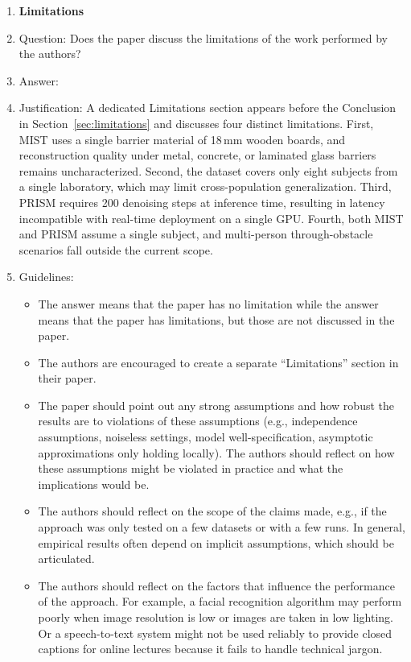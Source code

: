 \begin{enumerate}
\item {\bf Limitations}
    \item[] Question: Does the paper discuss the limitations of the work performed by the authors?
    \item[] Answer: \answerYes{}
    \item[] Justification: A dedicated Limitations section appears before the Conclusion in Section~\ref{sec:limitations} and discusses four distinct limitations. First, MIST uses a single barrier material of 18\,mm wooden boards, and reconstruction quality under metal, concrete, or laminated glass barriers remains uncharacterized. Second, the dataset covers only eight subjects from a single laboratory, which may limit cross-population generalization. Third, PRISM requires 200 denoising steps at inference time, resulting in latency incompatible with real-time deployment on a single GPU. Fourth, both MIST and PRISM assume a single subject, and multi-person through-obstacle scenarios fall outside the current scope.
    \item[] Guidelines:
    \begin{itemize}
        \item The answer \answerNA{} means that the paper has no limitation while the answer \answerNo{} means that the paper has limitations, but those are not discussed in the paper.
        \item The authors are encouraged to create a separate ``Limitations'' section in their paper.
        \item The paper should point out any strong assumptions and how robust the results are to violations of these assumptions (e.g., independence assumptions, noiseless settings, model well-specification, asymptotic approximations only holding locally). The authors should reflect on how these assumptions might be violated in practice and what the implications would be.
        \item The authors should reflect on the scope of the claims made, e.g., if the approach was only tested on a few datasets or with a few runs. In general, empirical results often depend on implicit assumptions, which should be articulated.
        \item The authors should reflect on the factors that influence the performance of the approach. For example, a facial recognition algorithm may perform poorly when image resolution is low or images are taken in low lighting. Or a speech-to-text system might not be used reliably to provide closed captions for online lectures because it fails to handle technical jargon.

\end{itemize}
\end{enumerate}
